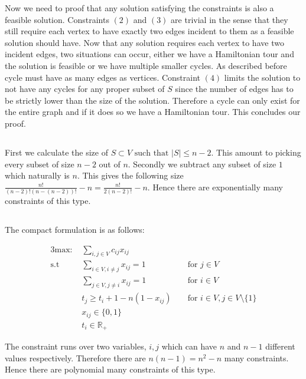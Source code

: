 Now we need to proof that any solution satisfying the constraints is also a feasible solution. Constraints $(2)$ and  $(3)$ are trivial in the sense that they still require each vertex to have exactly two edges incident to them as a feasible solution should have. Now that any solution requires each vertex to have two incident edges, two situations can occur, either we have a Hamiltonian tour and the solution is feasible or we have multiple smaller cycles. As described before cycle must have as many edges as vertices. Constraint $(4)$ limits the solution to not have any cycles for any proper subset of $S$ since the number of edges has to be strictly lower than the size of the solution. Therefore a cycle can only exist for the entire graph and if it does so we have a Hamiltonian tour. This concludes our proof.

\subsection{}  %
First we calculate the size of $S \subset V \text{ such that } |S| \leq n - 2$. This amount to picking every subset of size $n-2$ out of $n$. Secondly we subtract any subset of size $1$ which naturally is $n$. This gives the following size $\frac{n!}{(n-2)! (n - (n-2))!}-n = \frac{n!}{2 (n-2)!}-n$. Hence there are exponentially many constraints of this type. 


\subsection{} %

The compact formulation is as follows:

\begin{alignat}{3}
	\text{max: }    & \sum_{i,j \in V} c_{ij} x_{ij}\\
	\text{s.t }     & \sum_{i \in V, i \neq j} x_{ij} = 1  && \text{ for } j \in V\\
	& \sum_{j \in V, j \neq i} x_{ij} = 1  && \text{ for } i \in V\\
	& t_j \geq t_i + 1-n(1-x_{ij})  && \text{ for } i \in V, j \in V \setminus \{1\}\\
	& x_{ij} \in \{0,1\} \\
	& t_i \in \mathbb{R}_+ 
\end{alignat}

The constraint runs over two variables, $i,j$ which can have $n$ and $n-1$ different values respectively. Therefore there are $n(n-1) = n^2-n$ many constraints. Hence there are polynomial many constraints of this type.

